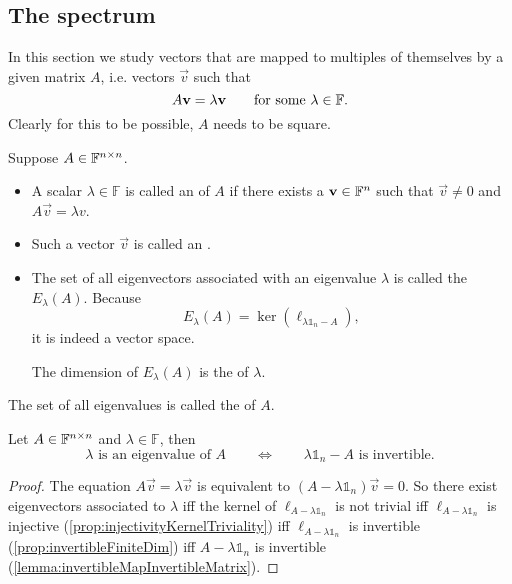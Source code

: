 \subsection{The spectrum}
In this section we study vectors that are mapped to multiples of themselves by a given matrix $A$, i.e. vectors $\vec{v}$ such that
\[ A\bm{\mathrm{v}} = \lambda \bm{\mathrm{v}} \qquad\text{for some $\lambda\in\mathbb{F}$.} \]
Clearly for this to be possible, $A$ needs to be square.
\begin{definition}
Suppose $A\in \mathbb{F}^{n\times n}$.
\begin{itemize}
\item  A scalar $\lambda\in \mathbb{F}$ is called an  of $A$ if there exists a $\bm{\mathrm{v}}\in \mathbb{F}^n$ such that $\vec{v}\neq 0$ and $A\vec{v} = \lambda v$.
\item Such a vector $\vec{v}$ is called an .
\item The set of all eigenvectors associated with an eigenvalue $\lambda$ is called the  $E_\lambda(A)$. Because
\[ E_\lambda(A) = \ker(\ell_{\lambda \mathbb{1}_{n} - A}), \]
it is indeed a vector space.

The dimension of $E_\lambda(A)$ is the  of $\lambda$.
\end{itemize}
The set of all eigenvalues is called the  of $A$.
\end{definition}
\begin{proposition}
Let $A\in \mathbb{F}^{n\times n}$ and $\lambda\in \mathbb{F}$, then
\[ \text{$\lambda$ is an eigenvalue of $A$} \qquad \iff \qquad \text{$\lambda \mathbb{1}_{n} - A$ is invertible.} \]
\end{proposition}
\begin{proof}
The equation $A\vec{v} = \lambda \vec{v}$ is equivalent to $(A-\lambda \mathbb{1}_n)\vec{v} = 0$. So there exist eigenvectors associated to $\lambda$ iff the kernel of $\ell_{A-\lambda \mathbb{1}_n}$ is not trivial iff $\ell_{A-\lambda \mathbb{1}_n}$ is injective (\ref{prop:injectivityKernelTriviality}) iff $\ell_{A-\lambda \mathbb{1}_n}$ is invertible (\ref{prop:invertibleFiniteDim}) iff $A-\lambda \mathbb{1}_n$ is invertible (\ref{lemma:invertibleMapInvertibleMatrix}).
\end{proof}

